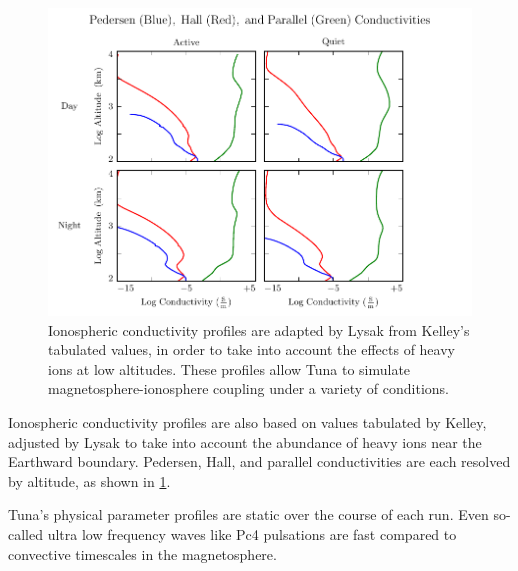 \begin{figure}[!htb]
  \centering
  \includegraphics[width=\textwidth]{figures/sigma.pdf}
  \caption[Ionospheric Conductivity Profiles]{
    Ionospheric conductivity profiles are adapted by Lysak\cite{lysak_2013}
    from Kelley's tabulated values\cite{kelley_1989}, in order to take into
    account the effects of heavy ions at low altitudes. These profiles allow
    Tuna to simulate magnetosphere-ionosphere coupling under a variety of
    conditions. 
  }
  \label{fig_sigma}
\end{figure}

Ionospheric conductivity profiles are also based on values tabulated by Kelley,
adjusted by Lysak\cite{lysak_2013} to take into account the abundance of heavy
ions near the Earthward boundary. Pedersen, Hall, and parallel conductivities
are each resolved by altitude, as shown in \cref{fig_sigma}. 

Tuna's physical parameter profiles are static over the course of each run. Even
so-called ultra low frequency waves like Pc4 pulsations are fast compared to
convective timescales in the magnetosphere. 



